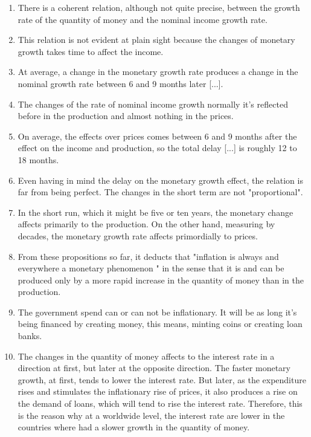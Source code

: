 \documentclass[12pt,a4paper,twoside]{book}
\begin{document}
\begin{enumerate}
\item There is a coherent relation, although not quite precise, between the growth rate of the quantity of money and the nominal income growth rate.
\item This relation is not evident at plain sight because the changes of monetary growth takes time to affect the income.
\item At average, a change in the monetary growth rate produces a change in the nominal growth rate between 6 and 9 months later [...].
\item The changes of the rate of nominal income growth normally it's reflected before in the production and almost nothing in the prices.
\item On average, the effects over prices comes between 6 and 9 months after the effect on the income and production, so the total delay [...] is roughly 12 to 18 months.
\item Even having in mind the delay on the monetary growth effect, the relation is far from being perfect. The changes in the short term are not "proportional".
\item In the short run, which it might be five or ten years, the monetary change affects primarily to the production. On the other hand, measuring by decades, the monetary growth rate affects primordially to prices.
\item From these propositions so far, it deducts that "inflation is always and everywhere a monetary phenomenon " in the sense that it is and can be produced only by a more rapid increase in the quantity of money than in the production.
\item The government spend can or can not be inflationary. It will be as long it's being financed by creating money, this means, minting coins or creating loan banks. 
\item The changes in the quantity of money affects to the interest rate in a direction at first, but later at the opposite direction. The faster monetary growth, at first, tends to lower the interest rate. But later, as the expenditure rises and stimulates the inflationary rise of prices, it also produces a rise on the demand of loans, which will tend to rise the interest rate. Therefore, this is the reason why at a worldwide level, the interest rate are lower in the countries where had a slower growth in the quantity of money. \cite[pp. 37-38]{friedman:paro}
\end{enumerate}
\end{document}
